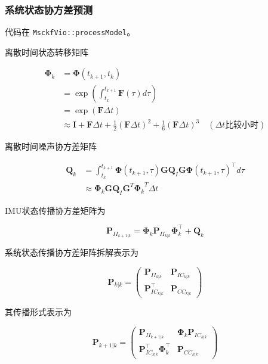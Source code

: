 \documentclass[12pt,a4paper]{article}
\begin{document}
\subsubsection{系统状态协方差预测}

代码在 \verb|MsckfVio::processModel|。

离散时间状态转移矩阵

\begin{equation}
\begin{aligned}
\boldsymbol{\Phi}_k 
&= \boldsymbol{\Phi}(t_{k+1}, t_k) \\
&= \exp\left(\int_{t_k}^{t_{k+1}} \mathbf{F}(\tau)d\tau\right) \\
&= \exp(\mathbf{F} \Delta t) \\
&\approx 
\mathbf{I} + \mathbf{F} \Delta t + 
\frac{1}{2} (\mathbf{F} \Delta t)^2 + \frac{1}{6} (\mathbf{F} \Delta t)^3
\quad (\Delta t \text{比较小时})
\end{aligned}
\end{equation}

离散时间噪声协方差矩阵

\begin{equation}
\begin{aligned}
\mathbf{Q}_k 
&=
\int_{t_k}^{t_{k+1}} \boldsymbol{\Phi}(t_{k+1},\tau)\mathbf{G}\mathbf{Q}_I\mathbf{G}\boldsymbol{\Phi}(t_{k+1},\tau)^\top d\tau \\
&\approx 
\boldsymbol{\Phi}_k \mathbf{G} \mathbf{Q}_I \mathbf{G}^T {\boldsymbol{\Phi}_k}^T \Delta t
\end{aligned}
\end{equation}

IMU状态传播协方差矩阵为

\begin{equation*}
\mathbf{P}_{II_{k+1|k}} = 
\boldsymbol{\Phi}_k\mathbf{P}_{II_{k|k}}\boldsymbol{\Phi}_k^\top + \mathbf{Q}_k
\end{equation*}

系统状态传播协方差矩阵拆解表示为

\begin{equation*}
\mathbf{P}_{k|k} = 
\begin{pmatrix}
\mathbf{P}_{II_{k|k}} & \mathbf{P}_{IC_{k|k}} \\
\mathbf{P}_{IC_{k|k}}^\top & \mathbf{P}_{CC_{k|k}}
\end{pmatrix}
\end{equation*}

其传播形式表示为

\begin{equation*}
\mathbf{P}_{k+1|k} = 
\begin{pmatrix}
\mathbf{P}_{II_{k+1|k}} & \boldsymbol{\Phi}_k \mathbf{P}_{IC_{k|k}} \\
\mathbf{P}_{IC_{k|k}}^\top \boldsymbol{\Phi}_k^\top & \mathbf{P}_{CC_{k|k}}
\end{pmatrix}
\end{equation*}
\end{document}
